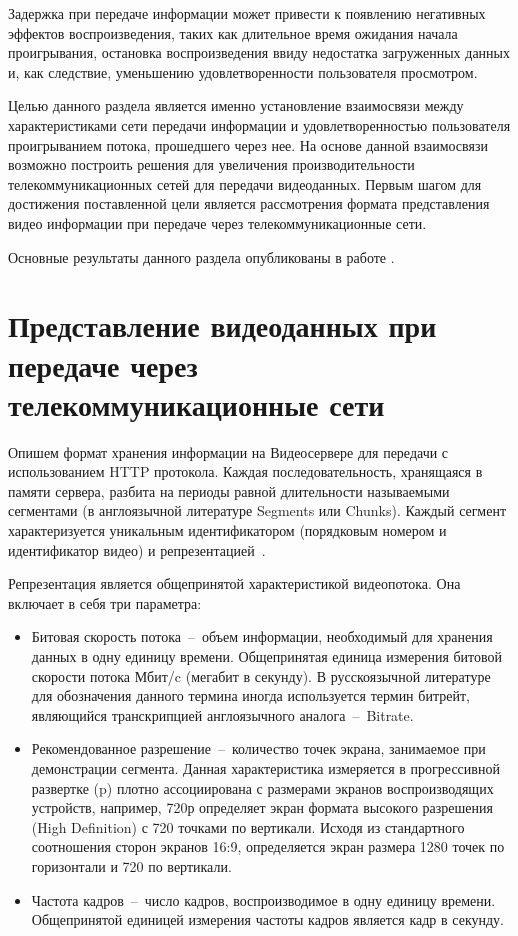 Задержка при передаче информации может привести к появлению негативных эффектов воспроизведения, таких как длительное время ожидания начала проигрывания, остановка воспроизведения ввиду недостатка загруженных данных и, как следствие, уменьшению удовлетворенности пользователя просмотром.

Целью данного раздела является именно установление взаимосвязи между характеристиками сети передачи информации и удовлетворенностью пользователя проигрыванием потока, прошедшего через нее. На основе данной взаимосвязи возможно построить решения для увеличения производительности телекоммуникационных сетей для передачи видеоданных. Первым шагом для достижения поставленной цели является рассмотрения формата представления видео информации при передаче через телекоммуникационные сети.

Основные результаты данного раздела опубликованы в работе \cite{past_ius}.

\section{Представление видеоданных при передаче через телекоммуникационные сети}
\label{chap1:VideoFormat}

Опишем формат хранения информации на Видеосервере для передачи с использованием HTTP протокола. Каждая последовательность, хранящаяся в памяти сервера, разбита на периоды равной длительности называемыми сегментами (в англоязычной литературе Segments или Chunks). Каждый сегмент характеризуется уникальным идентификатором (порядковым номером и идентификатор видео) и репрезентацией~\cite{dash_standard}.

Репрезентация является общепринятой характеристикой видеопотока. Она включает в себя три параметра:
\begin{itemize}
  \item Битовая скорость потока~--~объем информации, необходимый для хранения данных в одну единицу времени. Общепринятая единица измерения битовой скорости потока Мбит/c (мегабит в секунду). В русскоязычной литературе для обозначения данного термина иногда используется термин битрейт, являющийся транскрипцией англоязычного аналога~--~Bitrate.
  \item Рекомендованное разрешение~--~количество точек экрана, занимаемое при демонстрации сегмента. Данная характеристика измеряется в прогрессивной развертке (p) плотно ассоциирована с размерами экранов воспроизводящих устройств, например, 720р определяет экран формата высокого разрешения (High Definition) с 720 точками по вертикали. Исходя из стандартного соотношения сторон экранов 16:9, определяется экран размера 1280 точек по горизонтали и 720 по вертикали.
  \item Частота кадров~--~число кадров, воспроизводимое в одну единицу времени. Общепринятой единицей измерения частоты кадров является кадр в секунду.
\end{itemize}

